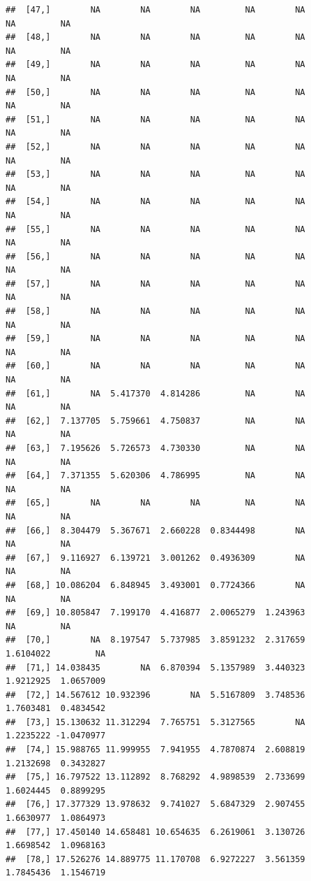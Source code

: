 \documentclass{article}\usepackage[]{graphicx}\usepackage[]{color}
\makeatletter
\newenvironment{kframe}{%
 \def\at@end@of@kframe{}%
 \ifinner\ifhmode%
  \def\at@end@of@kframe{\end{minipage}}%
  \begin{minipage}{\columnwidth}%
 \fi\fi%
 \def\FrameCommand##1{\hskip\@totalleftmargin \hskip-\fboxsep
 \colorbox{shadecolor}{##1}\hskip-\fboxsep
     \hskip-\linewidth \hskip-\@totalleftmargin \hskip\columnwidth}%
 \MakeFramed {\advance\hsize-\width
   \@totalleftmargin\z@ \linewidth\hsize
   \@setminipage}}%
 {\par\unskip\endMakeFramed%
 \at@end@of@kframe}
\newenvironment{knitrout}{}{} %
\makeatother
\begin{document}
\begin{knitrout}
\begin{kframe}
\begin{verbatim}
##  [47,]        NA        NA        NA         NA        NA         NA         NA
##  [48,]        NA        NA        NA         NA        NA         NA         NA
##  [49,]        NA        NA        NA         NA        NA         NA         NA
##  [50,]        NA        NA        NA         NA        NA         NA         NA
##  [51,]        NA        NA        NA         NA        NA         NA         NA
##  [52,]        NA        NA        NA         NA        NA         NA         NA
##  [53,]        NA        NA        NA         NA        NA         NA         NA
##  [54,]        NA        NA        NA         NA        NA         NA         NA
##  [55,]        NA        NA        NA         NA        NA         NA         NA
##  [56,]        NA        NA        NA         NA        NA         NA         NA
##  [57,]        NA        NA        NA         NA        NA         NA         NA
##  [58,]        NA        NA        NA         NA        NA         NA         NA
##  [59,]        NA        NA        NA         NA        NA         NA         NA
##  [60,]        NA        NA        NA         NA        NA         NA         NA
##  [61,]        NA  5.417370  4.814286         NA        NA         NA         NA
##  [62,]  7.137705  5.759661  4.750837         NA        NA         NA         NA
##  [63,]  7.195626  5.726573  4.730330         NA        NA         NA         NA
##  [64,]  7.371355  5.620306  4.786995         NA        NA         NA         NA
##  [65,]        NA        NA        NA         NA        NA         NA         NA
##  [66,]  8.304479  5.367671  2.660228  0.8344498        NA         NA         NA
##  [67,]  9.116927  6.139721  3.001262  0.4936309        NA         NA         NA
##  [68,] 10.086204  6.848945  3.493001  0.7724366        NA         NA         NA
##  [69,] 10.805847  7.199170  4.416877  2.0065279  1.243963         NA         NA
##  [70,]        NA  8.197547  5.737985  3.8591232  2.317659  1.6104022         NA
##  [71,] 14.038435        NA  6.870394  5.1357989  3.440323  1.9212925  1.0657009
##  [72,] 14.567612 10.932396        NA  5.5167809  3.748536  1.7603481  0.4834542
##  [73,] 15.130632 11.312294  7.765751  5.3127565        NA  1.2235222 -1.0470977
##  [74,] 15.988765 11.999955  7.941955  4.7870874  2.608819  1.2132698  0.3432827
##  [75,] 16.797522 13.112892  8.768292  4.9898539  2.733699  1.6024445  0.8899295
##  [76,] 17.377329 13.978632  9.741027  5.6847329  2.907455  1.6630977  1.0864973
##  [77,] 17.450140 14.658481 10.654635  6.2619061  3.130726  1.6698542  1.0968163
##  [78,] 17.526276 14.889775 11.170708  6.9272227  3.561359  1.7845436  1.1546719

\end{verbatim}
\end{kframe}
\end{knitrout}
\end{document}
